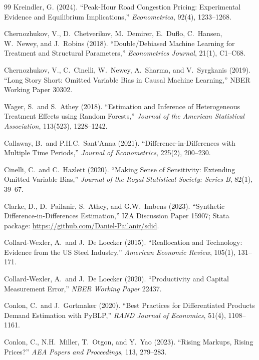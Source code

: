 \documentclass[11pt]{article}
\begin{document}
\begin{thebibliography}{99}
 Kreindler, G. (2024). ``Peak-Hour Road Congestion Pricing: Experimental Evidence and Equilibrium Implications,'' \emph{Econometrica}, 92(4), 1233--1268.

 Chernozhukov, V., D.~Chetverikov, M.~Demirer, E.~Duflo, C.~Hansen, W.~Newey, and J.~Robins (2018). ``Double/Debiased Machine Learning for Treatment and Structural Parameters,'' \emph{Econometrics Journal}, 21(1), C1--C68.

 Chernozhukov, V., C.~Cinelli, W.~Newey, A.~Sharma, and V.~Syrgkanis (2019). ``Long Story Short: Omitted Variable Bias in Causal Machine Learning,'' NBER Working Paper 30302.

 Wager, S.\ and S.\ Athey (2018). ``Estimation and Inference of Heterogeneous Treatment Effects using Random Forests,'' \emph{Journal of the American Statistical Association}, 113(523), 1228--1242.

 Callaway, B.\ and P.H.C.\ Sant'Anna (2021). ``Difference-in-Differences with Multiple Time Periods,'' \emph{Journal of Econometrics}, 225(2), 200--230.

 Cinelli, C.\ and C.~Hazlett (2020). ``Making Sense of Sensitivity: Extending Omitted Variable Bias,'' \emph{Journal of the Royal Statistical Society: Series B}, 82(1), 39--67.

 Clarke, D., D.\ Pailanir, S.\ Athey, and G.W.\ Imbens (2023). ``Synthetic Difference-in-Differences Estimation,'' IZA Discussion Paper 15907; Stata package: \url{https://github.com/Daniel-Pailanir/sdid}.

 Collard-Wexler, A.\ and J.~De Loecker (2015). ``Reallocation and Technology: Evidence from the US Steel Industry,'' \emph{American Economic Review}, 105(1), 131--171.

 Collard-Wexler, A.\ and J.\ De Loecker (2020). ``Productivity and Capital Measurement Error,'' \emph{NBER Working Paper} 22437.

 Conlon, C.\ and J.~Gortmaker (2020). ``Best Practices for Differentiated Products Demand Estimation with PyBLP,'' \emph{RAND Journal of Economics}, 51(4), 1108--1161.

 Conlon, C., N.H.~Miller, T.~Otgon, and Y.~Yao (2023). ``Rising Markups, Rising Prices?'' \emph{AEA Papers and Proceedings}, 113, 279--283.


\end{thebibliography}
\end{document}
